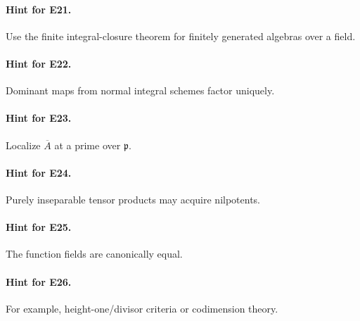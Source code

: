 \paragraph{Hint for E21.} Use the finite integral-closure theorem for finitely generated algebras over a field.

\paragraph{Hint for E22.} Dominant maps from normal integral schemes factor uniquely.

\paragraph{Hint for E23.} Localize $\overline A$ at a prime over $\mathfrak p$.

\paragraph{Hint for E24.} Purely inseparable tensor products may acquire nilpotents.

\paragraph{Hint for E25.} The function fields are canonically equal.

\paragraph{Hint for E26.} For example, height-one/divisor criteria or codimension theory.
